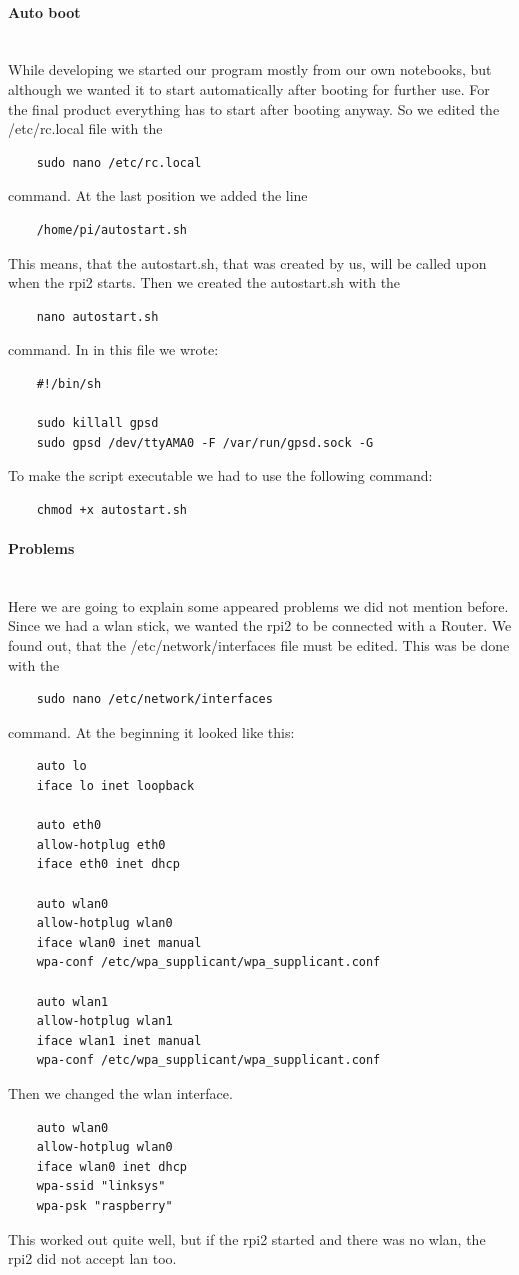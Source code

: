 \paragraph{Auto boot} \mbox{}\\
While developing we started our program mostly from our own notebooks, but although we wanted it to start automatically after booting for further use. For the final product everything has to start after booting anyway. So we edited the /etc/rc.local file with the 
\begin{verbatim}
	sudo nano /etc/rc.local
\end{verbatim} 
command. At the last position we added the line
\begin{verbatim}
	/home/pi/autostart.sh 
\end{verbatim} 
This means, that the autostart.sh, that was created by us, will be called upon when the \gls{rpi2} starts. Then we created the autostart.sh with the 
\begin{verbatim}
	nano autostart.sh
\end{verbatim}
command. In in this file we wrote:
\begin{verbatim}
	#!/bin/sh

	sudo killall gpsd
	sudo gpsd /dev/ttyAMA0 -F /var/run/gpsd.sock -G
\end{verbatim}
To make the script executable we had to use the following command:
\begin{verbatim}
	chmod +x autostart.sh
\end{verbatim}
\paragraph{Problems} \mbox{}\\
Here we are going to explain some appeared problems we did not mention before.\newline
Since we had a \gls{wlan} stick, we wanted the \gls{rpi2} to be connected with a Router. We found out, that the /etc/network/interfaces file must be edited. This was be done with the
\begin{verbatim}
	sudo nano /etc/network/interfaces 
\end{verbatim}
command.\newline
At the beginning it looked like this:
\begin{verbatim}
	auto lo
	iface lo inet loopback

	auto eth0
	allow-hotplug eth0
	iface eth0 inet dhcp

	auto wlan0
	allow-hotplug wlan0
	iface wlan0 inet manual
	wpa-conf /etc/wpa_supplicant/wpa_supplicant.conf

	auto wlan1
	allow-hotplug wlan1
	iface wlan1 inet manual
	wpa-conf /etc/wpa_supplicant/wpa_supplicant.conf
\end{verbatim}
Then we changed the \gls{wlan} interface.
\begin{verbatim}
	auto wlan0
	allow-hotplug wlan0
	iface wlan0 inet dhcp
	wpa-ssid "linksys"
	wpa-psk "raspberry"
\end{verbatim}
This worked out quite well, but if the \gls{rpi2} started and there was no \gls{wlan}, the \gls{rpi2} did not accept \gls{lan} too.
\newpage
